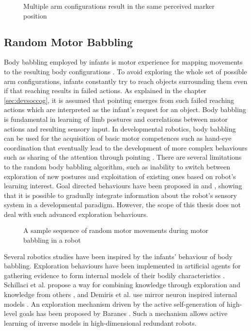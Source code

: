 \begin{figure}[h]
\centering
{}
\caption{Multiple arm configurations result in the same perceived marker position}
\label{lab:handpositions}
\end{figure}


\subsection{Random Motor Babbling}
\label{sec:babbling}

Body babbling employed by infants is motor experience for mapping movements to the resulting body configurations \citep{Meltzoff97}. 
To avoid exploring the whole set of possible arm configurations, infants 
constantly try to reach objects surrounding them even if that reaching results 
in failed actions. As explained in the chapter \ref{sec:devsoccog}, it is 
assumed that pointing emerges from such failed reaching actions which are 
interpreted as the infant's request for an object. 
Body babbling is fundamental in learning of limb postures and correlations between motor actions and resulting sensory input. In developmental robotics, body babbling can be used for the acquisition of basic motor competences such as hand-eye coordination \citep{Lungarella2003} that eventually lead to the development of more complex behaviours such as sharing of the attention through pointing \citep{Hafner2011}. 
There are several limitations to the random body babbling algorithm, such as inability to switch between exploration of new postures and exploitation of existing ones based on robot's learning interest. Goal directed behaviours have been proposed in \citep{olsson2006} and \citep{baranes2013}, showing that it is possible to gradually integrate information about the robot's sensory system in a developmental paradigm. However, the scope of this thesis does not deal with such advanced exploration behaviours.

\begin{figure}[t]
\centering
{}
\caption{A sample sequence of random motor movements during motor babbling in a robot}
\label{lab:babbling}
\end{figure}


Several robotics studies have been inspired by the infants' behaviour of body babbling.
Exploration behaviours have been implemented in artificial agents for gathering 
evidence to form internal models of their bodily characteristics 
\citep{SchillaciHLG13, Saegusa2009}.
Schillaci et al. propose a way for combining knowledge through exploration and 
knowledge from others \citep{SchillaciHLG13}, and Demiris et al. use mirror 
neuron inspired internal models \citep{Demiris2005}.
An exploration mechanism driven by the active 
self-generation of high-level goals has been proposed by Baranes 
\citep{baranes2013}. Such a mechanism allows active learning of inverse models 
in high-dimensional redundant robots. 

